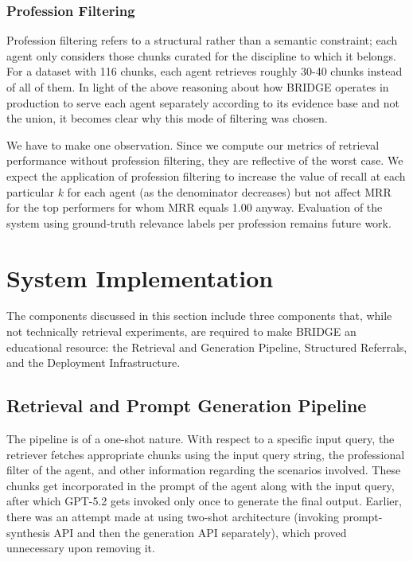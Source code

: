 \documentclass[pdflatex,sn-mathphys-num]{sn-jnl}
\theoremstyle{thmstyleone}
\theoremstyle{thmstyletwo}
\theoremstyle{thmstylethree}
\begin{document}
\subsubsection{Profession Filtering}

Profession filtering refers to a structural rather than a semantic constraint; each agent only considers those chunks curated for the discipline to which it belongs. For a dataset with 116 chunks, each agent retrieves roughly 30-40 chunks instead of all of them. In light of the above reasoning about how BRIDGE operates in production to serve each agent separately according to its evidence base and not the union, it becomes clear why this mode of filtering was chosen.

We have to make one observation. Since we compute our metrics of retrieval performance without profession filtering, they are reflective of the worst case. We expect the application of profession filtering to increase the value of recall at each particular $k$ for each agent (as the denominator decreases) but not affect MRR for the top performers for whom MRR equals 1.00 anyway. Evaluation of the system using ground-truth relevance labels per profession remains future work.

\section{System Implementation}\label{sec:implementation}

The components discussed in this section include three components that, while not technically retrieval experiments, are required to make BRIDGE an educational resource: the Retrieval and Generation Pipeline, Structured Referrals, and the Deployment Infrastructure.

\subsection{Retrieval and Prompt Generation Pipeline}

The pipeline is of a one-shot nature. With respect to a specific input query, the retriever fetches appropriate chunks using the input query string, the professional filter of the agent, and other information regarding the scenarios involved. These chunks get incorporated in the prompt of the agent along with the input query, after which GPT-5.2 gets invoked only once to generate the final output. Earlier, there was an attempt made at using two-shot architecture (invoking prompt-synthesis API and then the generation API separately), which proved unnecessary upon removing it.
\end{document}
